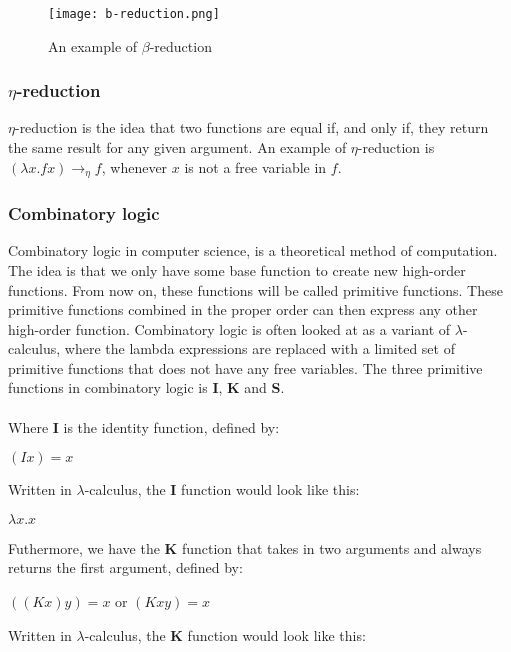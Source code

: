\begin{figure}
    \centering
    \texttt{[image: b-reduction.png]}
    \caption{An example of $\beta$-reduction}
    \label{fig:beta-reduction}
\end{figure}

\subsubsection{$\eta$-reduction}
$\eta$-reduction is the idea that two functions are equal if, and only if, they return the same result for any given argument. An example of $\eta$-reduction is $(\lambda x.f x)  \rightarrow_\eta f$, whenever $x$ is not a free variable in $f$.

\subsubsection{Combinatory logic}
Combinatory logic in computer science, is a theoretical method of computation. The idea is that we only have some base function to create new high-order functions. From now on, these functions will be called primitive functions. These primitive functions combined in the proper order can then express any other high-order function. Combinatory logic is often looked at as a variant of $\lambda$-calculus, where the lambda expressions are replaced with a limited set of primitive functions that does not have any free variables. 
The three primitive functions in combinatory logic is \textbf{I}, \textbf{K} and \textbf{S}.
\\ \\
Where \textbf{I} is the identity function, defined by: \\ 
\begin{center}
    $(I x) = x$\\    
\end{center}
Written in $\lambda$-calculus, the \textbf{I} function would look like this:\\
\begin{center}
    $\lambda x.x$\\    
\end{center}
Futhermore, we have the \textbf{K} function that takes in two arguments and always returns the first argument, defined by:
\begin{center}
    $ ((K x) y) = x$ or $(K x y) = x$\\    
\end{center}
Written in $\lambda$-calculus, the \textbf{K} function would look like this:\\
